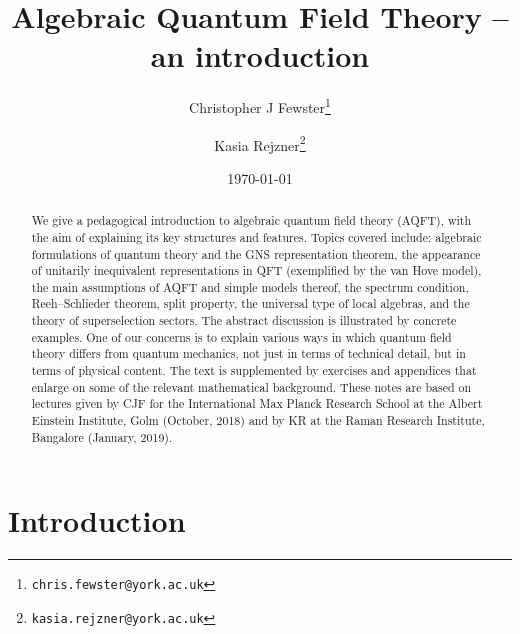 \documentclass[12pt,a4paper]{article}
\newcommand{\1}{\mathds{1}}                         %
\begin{document}
	\title{Algebraic Quantum Field Theory -- an introduction} 
	
	
	\author[1]{Christopher J Fewster\thanks{\tt chris.fewster@york.ac.uk}}
	\author[1]{Kasia Rejzner\thanks{\tt kasia.rejzner@york.ac.uk}}
 
	\date{\today}%
	\maketitle 
	\begin{abstract}  
	We give a pedagogical introduction to algebraic quantum field theory (AQFT), with the aim of explaining its key structures and features. Topics covered include: algebraic formulations of quantum theory and the GNS representation theorem, the appearance of unitarily inequivalent representations in QFT (exemplified by the van Hove model), the main assumptions of AQFT and simple models thereof, the spectrum condition, Reeh--Schlieder theorem, split property, the universal type of local algebras, and the theory of superselection sectors. The abstract discussion is illustrated by concrete examples. One of our concerns is to explain various ways in which quantum field theory differs from quantum mechanics, not just in terms of technical detail, but in terms of physical content. 
	The text is supplemented by exercises and appendices that enlarge on some of the relevant mathematical background. These notes are based on lectures given by CJF for the International Max Planck Research School at the Albert Einstein Institute, Golm (October, 2018) and by KR at the Raman Research Institute, Bangalore (January, 2019). 
	\end{abstract} 
	\tableofcontents 
	
	\section{Introduction}
		
\end{document}
